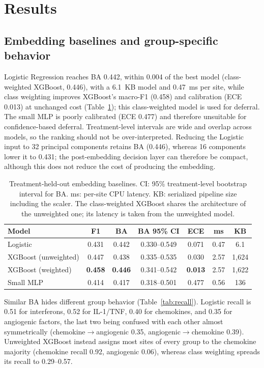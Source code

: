 \documentclass[conference]{IEEEtran}
\begin{document}
\section{Results}
\subsection{Embedding baselines and group-specific behavior}
Logistic Regression reaches BA 0.442, within 0.004 of the best model (class-weighted XGBoost, 0.446), with a 6.1~KB model and 0.47~ms per site, while class weighting improves XGBoost's macro-F1 (0.458) and calibration (ECE 0.013) at unchanged cost (Table~\ref{tab:embedding}); this class-weighted model is used for deferral. The small MLP is poorly calibrated (ECE 0.477) and therefore unsuitable for confidence-based deferral. Treatment-level intervals are wide and overlap across models, so the ranking should not be over-interpreted. Reducing the Logistic input to 32 principal components retains BA (0.446), whereas 16 components lower it to 0.431; the post-embedding decision layer can therefore be compact, although this does not reduce the cost of producing the embedding.

\begin{table}[t]
\caption{Treatment-held-out embedding baselines. CI: 95\% treatment-level bootstrap interval for BA. ms: per-site CPU latency. KB: serialized pipeline size including the scaler. The class-weighted XGBoost shares the architecture of the unweighted one; its latency is taken from the unweighted model.}
\label{tab:embedding}
\centering
\setlength{\tabcolsep}{2.5pt}
\begin{tabular}{lcccccc}
\toprule
Model & F1 & BA & BA 95\% CI & ECE & ms & KB \\
\midrule
Logistic & 0.431 & 0.442 & 0.330--0.549 & 0.071 & 0.47 & 6.1 \\
XGBoost (unweighted) & 0.447 & 0.438 & 0.335--0.535 & 0.030 & 2.57 & 1,624 \\
XGBoost (weighted) & \textbf{0.458} & \textbf{0.446} & 0.341--0.542 & \textbf{0.013} & 2.57 & 1,622 \\
Small MLP & 0.414 & 0.417 & 0.318--0.501 & 0.477 & 0.56 & 136 \\
\bottomrule
\end{tabular}
\end{table}

Similar BA hides different group behavior (Table~\ref{tab:recall}). Logistic recall is 0.51 for interferons, 0.52 for IL-1/TNF, 0.40 for chemokines, and 0.35 for angiogenic factors, the last two being confused with each other almost symmetrically (chemokine$\rightarrow$angiogenic 0.35, angiogenic$\rightarrow$chemokine 0.39). Unweighted XGBoost instead assigns most sites of every group to the chemokine majority (chemokine recall 0.92, angiogenic 0.06), whereas class weighting spreads its recall to 0.29--0.57.
\end{document}
